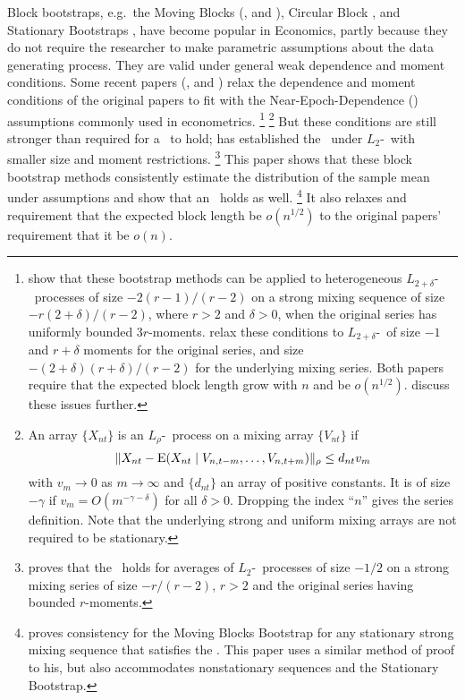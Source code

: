 \documentclass[11pt]{article}
\begin{document}
\newpage
\noindent Block bootstraps, e.g.\ the Moving Blocks
(\citealp{Kun:89}, and \citealp{LiS:92}), Circular Block \citep{PoR:92}, and Stationary
Bootstraps \citep{PoR:94}, have become popular in Economics, partly
because they do not require the researcher to make parametric
assumptions about the data generating process.  They are valid under
general weak dependence and moment conditions.  Some recent papers
(\citealp{GoW:02}, and \citealp{GoJ:03}) relax the dependence and moment
conditions of the original papers to fit with the Near-Epoch-Dependence
(\ned) assumptions commonly used in econometrics.%
\footnote{\citet{GoW:02} show that these bootstrap methods can be
  applied to heterogeneous $L_{2+\delta}$-\ned\ processes of size
  $-2(r-1)/(r-2)$ on a strong mixing sequence of size
  $-r(2+\delta)/(r-2)$, where $r > 2$ and $\delta >0$, when the
  original series has uniformly bounded $3r$-moments.  \citet{GoJ:03}
  relax these conditions to $L_{2+\delta}$-\ned\ of size $-1$ and
  $r+\delta$ moments for the original series, and size
  $-(2+\delta)(r+\delta)/(r-2)$ for the underlying mixing series.
  Both papers require that the expected block length grow with $n$ and
  be $o(n^{1/2})$.  \cite{GoP:11} discuss these issues further.}%
\footnote{An array $\{X_{nt}\}$ is an $L_{\rho}$-\ned\ process on a
  mixing array $\{V_{nt}\}$ if
  \begin{equation}
    \| X_{nt} - \operatorname{E}(X_{nt}
    \mid V_{n,t-m},\dots,V_{n,t+m}) \|_{\rho} \leq d_{nt} v_m
  \end{equation}
  with $v_m \to 0$ as $m \to \infty$ and $\{d_{nt}\}$ an array of
  positive constants.  It is of size $-\gamma$ if $v_m = O(m^{-\gamma
    - \delta})$ for all $\delta>0$.  Dropping the index ``$n$'' gives
  the series definition.  Note that the underlying strong and uniform mixing arrays
  are not required to be stationary.} %
But these conditions are still stronger than
required for a \clt\ to hold; \citet{Jon:97} has established the \clt\
under $L_2$-\ned\ with smaller size and moment
restrictions.%
\footnote{\citet{Jon:97} proves that the \clt\ holds for averages of
  $L_2$-\ned\ processes of size $-1/2$ on a strong mixing series of
  size $-r/(r-2)$, $r > 2$ and the original series having bounded
  $r$-moments.} %
This paper shows that these block bootstrap
methods consistently estimate the distribution of the sample mean
under \citepos{Jon:97} assumptions and show that an \fclt\ holds as
well.%
\footnote{\citet{Rad:96} proves consistency for the Moving Blocks
  Bootstrap for any stationary strong mixing sequence that satisfies
  the \clt. This paper uses a similar method of proof to his, but also
  accommodates nonstationary sequences and the Stationary
  Bootstrap.} %
It also relaxes  and  requirement that
the expected block length be $o(n^{1/2})$ to the original papers'
requirement that it be $o(n)$.
\end{document}
